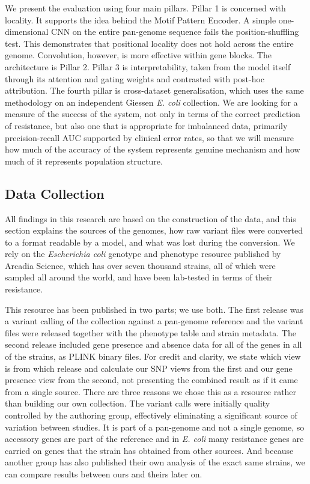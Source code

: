 \documentclass[journal]{IEEEtran}
\begin{document}
We present the evaluation using four main pillars. Pillar 1 is concerned with
locality. It supports the idea behind the Motif Pattern Encoder. A simple
one-dimensional CNN on the entire pan-genome sequence fails the position-shuffling
test. This demonstrates that positional locality does not hold across the entire
genome. Convolution, however, is more effective within gene blocks. The
architecture is Pillar 2. Pillar 3 is interpretability, taken from the model itself
through its attention and gating weights and contrasted with post-hoc attribution.
The fourth pillar is cross-dataset generalisation, which uses the same methodology
on an independent Giessen \textit{E. coli} collection. We are looking for a measure
of the success of the system, not only in terms of the correct prediction of
resistance, but also one that is appropriate for imbalanced data, primarily
precision-recall AUC supported by clinical error rates, so that we will measure how
much of the accuracy of the system represents genuine mechanism and how much of it
represents population structure.

\subsection{Data Collection}
\label{sec:data}

All findings in this research are based on the construction of the data, and this
section explains the sources of the genomes, how raw variant files were converted
to a format readable by a model, and what was lost during the conversion. We rely
on the \textit{Escherichia coli} genotype and phenotype resource published by
Arcadia Science, which has over seven thousand strains, all of which were sampled
all around the world, and have been lab-tested in terms of their resistance.

This resource has been published in two parts; we use both. The first release
\cite{morin2024ecoli} was a variant calling of the collection against a pan-genome
reference and the variant files were released together with the phenotype table and
strain metadata. The second release \cite{york2025amr} included gene presence and
absence data for all of the genes in all of the strains, as PLINK
\cite{purcell2007plink} binary files. For
credit and clarity, we state which view is from which release and calculate our SNP
views from the first and our gene presence view from the second, not presenting the
combined result as if it came from a single source. There are three reasons we
chose this as a resource rather than building our own collection. The variant calls
were initially quality controlled by the authoring group, effectively eliminating a
significant source of variation between studies. It is part of a pan-genome and not
a single genome, so accessory genes are part of the reference and in \textit{E.
coli} many resistance genes are carried on genes that the strain has obtained from
other sources. And because another group has also published their own analysis of
the exact same strains, we can compare results between ours and theirs later on.
\end{document}
